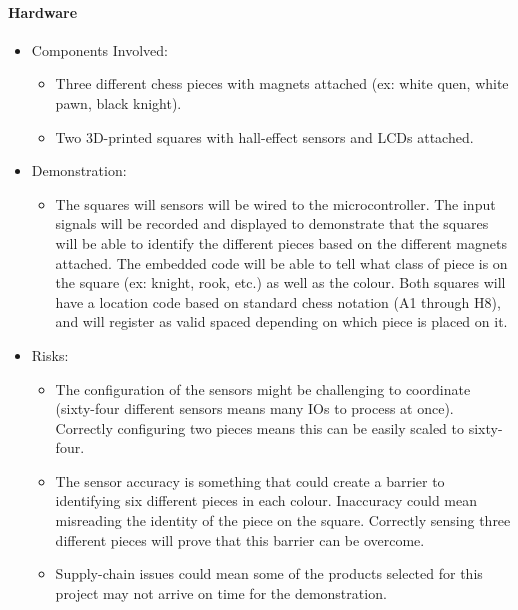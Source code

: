 \documentclass{article}
\begin{document}
\paragraph{Hardware}
\begin{itemize}
    \item Components Involved: 
    \begin{itemize}
        \item Three different chess pieces with magnets attached (ex: white quen, white pawn, black knight).
        \item Two 3D-printed squares with hall-effect sensors and LCDs attached.
    \end{itemize}
    \item Demonstration:
    \begin{itemize}
        \item The squares will sensors will be wired to the microcontroller. The input signals will be recorded and displayed to demonstrate that the squares will be able to identify the different pieces based on the different magnets attached. The embedded code will be able to tell what class of piece is on the square (ex: knight, rook, etc.) as well as the colour. Both squares will have a location code based on standard chess notation (A1 through H8), and will register as valid spaced depending on which piece is placed on it. 
    \end{itemize} 
    \item Risks:
    \begin{itemize}
        \item The configuration of the sensors might be challenging to coordinate (sixty-four different sensors means many IOs to process at once). Correctly configuring two pieces means this can be easily scaled to sixty-four.
        \item The sensor accuracy is something that could create a barrier to identifying six different pieces in each colour. Inaccuracy could mean misreading the identity of the piece on the square. Correctly sensing three different pieces will prove that this barrier can be overcome.
        \item Supply-chain issues could mean some of the products selected for this project may not arrive on time for the demonstration.
    \end{itemize}
\end{itemize}
\end{document}
